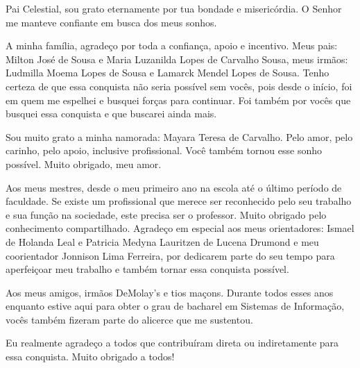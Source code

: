 \documentclass[
	12pt,				%
    oneside,			%
	a4paper,			%
	english,			%
	french,				%
	spanish,			%
	brazil,				%
	]{abntex2}
\begin{document}
\frenchspacing 


\imprimircapa

\imprimirfolhaderosto*






\begin{agradecimentos}

	Pai Celestial, sou grato eternamente por tua bondade e misericórdia. O Senhor me manteve confiante em busca dos meus sonhos.

	A minha família, agradeço por toda a confiança, apoio e incentivo. Meus pais: Milton José de Sousa e Maria Luzanilda Lopes de Carvalho Sousa, meus irmãos: Ludmilla Moema Lopes de Sousa e Lamarck Mendel Lopes de Sousa. Tenho certeza de que essa conquista não seria possível sem vocês, pois desde o início, foi em quem me espelhei e busquei forças para continuar. Foi também por vocês que busquei essa conquista e que buscarei ainda mais.

	Sou muito grato a minha namorada: Mayara Teresa de Carvalho. Pelo amor, pelo carinho, pelo apoio, inclusive profissional. Você também tornou esse sonho possível. Muito obrigado, meu amor.

	Aos meus mestres, desde o meu primeiro ano na escola até o último período de faculdade. Se existe um profissional que merece ser reconhecido pelo seu trabalho e sua função na sociedade, este precisa ser o professor. Muito obrigado pelo conhecimento compartilhado. Agradeço em especial aos meus orientadores: Ismael de Holanda Leal e Patricia Medyna Lauritzen de Lucena Drumond e meu coorientador Jonnison Lima Ferreira, por dedicarem parte do seu tempo para aperfeiçoar meu trabalho e também tornar essa conquista possível.

	Aos meus amigos, irmãos DeMolay’s e tios maçons. Durante todos esses anos enquanto estive aqui para obter o grau de bacharel em Sistemas de Informação, vocês também fizeram parte do alicerce que me sustentou.

	Eu realmente agradeço a todos que contribuíram direta ou indiretamente para essa conquista. Muito obrigado a todos!


\end{agradecimentos}
\end{document}
